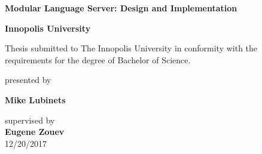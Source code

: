 \begin{titlepage}

\begin{center}

\textbf{\Large{Modular Language Server: Design and Implementation}}
\vspace{4cm}

\textbf{\Large Innopolis University} \\

\vspace{0.60cm}

{\Large Thesis submitted to The Innopolis University in conformity with the
requirements for the degree of Bachelor of Science.}

\vspace{6cm}

{\Large presented by}

\vspace{0.40cm}

\textbf{\Large Mike Lubinets}
\vspace{0.40cm}

{\Large supervised by}\\
\vspace{0.40cm}
{\bf\Large Eugene Zouev}\\
\vspace{0.60cm}
{\Large 12/20/2017}


\end{center}
\end{titlepage}
